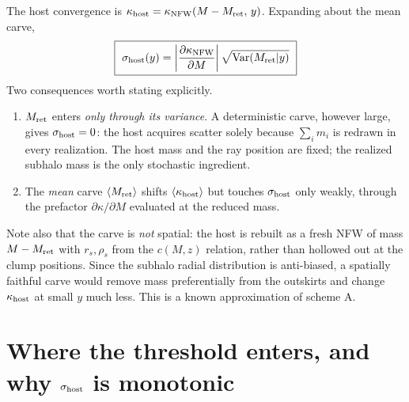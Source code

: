 \documentclass[11pt]{article}
\newcommand{\Mret}{M_{\rm ret}}
\begin{document}
The host convergence is $\kappa_{\rm host}=\kappa_{\rm NFW}(M-\Mret,\,y)$. Expanding about
the mean carve,
\begin{equation}
  \boxed{\ \sigma_{\rm host}(y)=
  \left|\frac{\partial\kappa_{\rm NFW}}{\partial M}\right|
  \sqrt{{\rm Var}(\Mret|y)}\ }
  \label{eq:sighost}
\end{equation}
Two consequences worth stating explicitly.
\begin{enumerate}
  \item $\Mret$ enters \emph{only through its variance}. A deterministic carve, however
        large, gives $\sigma_{\rm host}=0$: the host acquires scatter solely because
        $\sum_i m_i$ is redrawn in every realization. The host mass and the ray position
        are fixed; the realized subhalo mass is the only stochastic ingredient.
  \item The \emph{mean} carve $\langle\Mret\rangle$ shifts $\langle\kappa_{\rm host}\rangle$
        but touches $\sigma_{\rm host}$ only weakly, through the prefactor
        $\partial\kappa/\partial M$ evaluated at the reduced mass.
\end{enumerate}

Note also that the carve is \emph{not} spatial: the host is rebuilt as a fresh NFW of mass
$M-\Mret$ with $r_s,\rho_s$ from the $c(M,z)$ relation, rather than hollowed out at the
clump positions. Since the subhalo radial distribution is anti-biased, a spatially faithful
carve would remove mass preferentially from the outskirts and change $\kappa_{\rm host}$ at
small $y$ much less. This is a known approximation of scheme A.

\section{Where the threshold enters, and why $\sigma_{\rm host}$ is monotonic}
\end{document}
